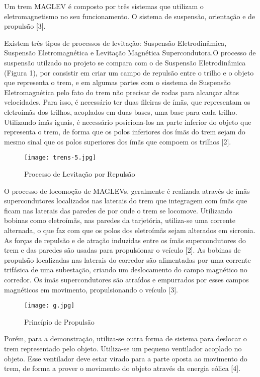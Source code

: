 \documentclass[
	12pt,				%
	openany,			%
	a4paper,			%
	english,			%
	spanish,			%
	brazil,				%
	]{abntex2}
\begin{document}
Um trem MAGLEV é composto por três sistemas que utilizam o eletromagnetismo no seu funcionamento. O sistema de suspensão, orientação e de propulsão [3].

Existem três tipos de processos de levitação: Suspensão Eletrodinâmica, Suspensão Eletromagnética e Levitação Magnética Supercondutora.O processo de suspensão utilzado no projeto se compara com o de Suspensão Eletrodinâmica (Figura 1), por consistir em criar um campo de repulsão entre o trilho e o objeto que representa o trem, e em algumas partes com o sisstema de Suspensão Eletromagnética pelo fato do trem não precisar de rodas para alcançar altas velocidades. Para isso, é necessário ter duas fileiras de ímãs, que representam os eletroímãs dos trilhos, acoplados em duas bases, uma base para cada trilho. Utilizando ímãs iguais, é necessário posiciona-los na parte inferior do objeto que representa o trem, de forma que os polos inferiores dos ímãs do trem sejam do mesmo sinal que os polos superiores dos ímãs que compoem os trilhos [2].


\begin{figure}
\centering
\texttt{[image: trens-5.jpg]}
\caption{Processo de Levitação por Repulsão}
\label{Rotulo}
\end{figure}

O processo de locomoção de MAGLEVs, geralmente é realizada através de ímãs supercondutores localizados nas laterais do trem que integragem com ímãs que ficam nas laterais das paredes de por onde o trem se locomove. Utilizando bobinas como eletroímãs, nas paredes da tarjetória, utiliza-se uma corrente alternada, o que faz com que os polos dos eletroímãs sejam alterados em sicronia. As forças de repulsão e de atração induzidas entre os ímãs supercondutores do trem e das paredes são usadas para propulsionar o veículo [2]. As bobinas de propulsão localizadas nas laterais do corredor são alimentadas por uma corrente trifásica de uma subestação, criando um deslocamento do campo magnético no corredor. Os ímãs supercondutores são atraídos e empurrados por esses campos magnéticos em movimento, propulsionando o veículo [3].


\begin{figure}
\centering
\texttt{[image: g.jpg]}
\caption{Princípio de Propulsão}
\label{Rotulo}
\end{figure}

Porém, para a demonstração, utiliza-se outra forma de sistema para deslocar o trem representado pelo objeto. Utiliza-se um pequeno ventilador acoplado no objeto. Esse ventilador deve estar virado para a parte oposta ao movimento do trem, de forma a prover o movimento do objeto através da energia eólica [4]. 
\end{document}
